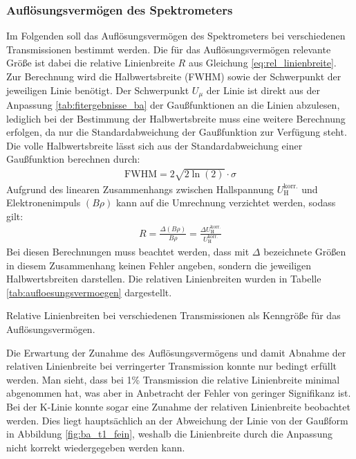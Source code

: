\documentclass[11pt, a4paper]{article}
\numberwithin{equation}{section}
\begin{document}
\subsubsection{Auflösungsvermögen des Spektrometers}
Im Folgenden soll das Auflösungsvermögen des Spektrometers bei verschiedenen Transmissionen bestimmt werden.
Die für das Auflösungsvermögen relevante Größe ist dabei die relative Linienbreite $R$ aus Gleichung \eqref{eq:rel_linienbreite}.
Zur Berechnung wird die Halbwertsbreite (FWHM) sowie der Schwerpunkt der jeweiligen Linie benötigt.
Der Schwerpunkt $U_\mu$ der Linie ist direkt aus der Anpassung \ref{tab:fitergebnisse_ba} der Gaußfunktionen an die Linien abzulesen, lediglich bei der Bestimmung der Halbwertsbreite muss eine weitere Berechnung erfolgen, da nur die Standardabweichung der Gaußfunktion zur Verfügung steht.
Die volle Halbwertsbreite lässt sich aus der Standardabweichung einer Gaußfunktion berechnen durch:
\begin{align}
	\mathrm{FWHM} = 2 \sqrt{2\ln(2)} \cdot \sigma
\end{align}
Aufgrund des linearen Zusammenhangs zwischen Hallspannung $U_\mathrm{H}^\mathrm{korr.}$ und Elektronenimpuls $(B \rho)$ kann auf die Umrechnung verzichtet werden, sodass gilt:
\begin{align}
	R = \frac{\Delta (B \rho)}{B \rho} = \frac{\Delta U_\mathrm{H}^\mathrm{korr.}}{U_\mathrm{H}^\mathrm{korr.}}
\end{align}
Bei diesen Berechnungen muss beachtet werden, dass mit $\Delta$ bezeichnete Größen in diesem Zusammenhang keinen Fehler angeben, sondern die jeweiligen Halbwertsbreiten darstellen.
Die relativen Linienbreiten wurden in Tabelle \ref{tab:aufloesungsvermoegen} dargestellt.
\begin{table}[h]
	\centering
	
	\caption{Relative Linienbreiten bei verschiedenen Transmissionen als Kenngröße für das Auflösungsvermögen.}
	\label{tab:aufloesungsvermoegen}
\end{table}
Die Erwartung der Zunahme des Auflösungsvermögens und damit Abnahme der relativen Linienbreite bei verringerter Transmission konnte nur bedingt erfüllt werden.
Man sieht, dass bei 1\% Transmission die relative Linienbreite minimal abgenommen hat, was aber in Anbetracht der Fehler von geringer Signifikanz ist.
Bei der K-Linie konnte sogar eine Zunahme der relativen Linienbreite beobachtet werden.
Dies liegt hauptsächlich an der Abweichung der Linie von der Gaußform in Abbildung \ref{fig:ba_t1_fein}, weshalb die Linienbreite durch die Anpassung nicht korrekt wiedergegeben werden kann.
\end{document}
